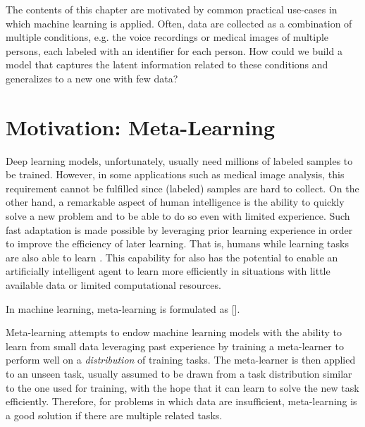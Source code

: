 The contents of this chapter are motivated by common practical use-cases in which machine learning is applied. Often, data are collected as a combination of multiple conditions, e.g. the voice recordings or medical images of multiple persons, each labeled with an identifier for each person. How could we build a model that captures the latent information related to these conditions and generalizes to a new one with few data? 

\section{Motivation: Meta-Learning}
Deep learning models, unfortunately, usually need millions of labeled samples to be trained. However, in some applications such as medical image analysis, this requirement cannot be fulfilled since (labeled) samples are hard to collect. On the other hand, a remarkable aspect of human intelligence is the ability to quickly solve a new problem and to be able to do so even with limited experience. Such fast adaptation is made possible by leveraging prior learning experience in order to improve the efficiency of later learning. That is, humans while learning tasks are also able to learn . This capability for  also has the potential to enable an artificially intelligent agent to learn more efficiently in situations with little available data or limited computational resources.

In machine learning, meta-learning is formulated as  [\cite{Grant2018}]. 

Meta-learning attempts to endow machine learning models with the ability to learn from small data leveraging past experience by training a meta-learner to perform well on a \textit{distribution} of training tasks. The meta-learner is then applied to an unseen task, usually assumed to be drawn from a task distribution similar to the one used for training, with the hope that it can learn to solve the new task efficiently. Therefore, for problems in which data are insufficient, meta-learning is a good solution if there are multiple related tasks. 

